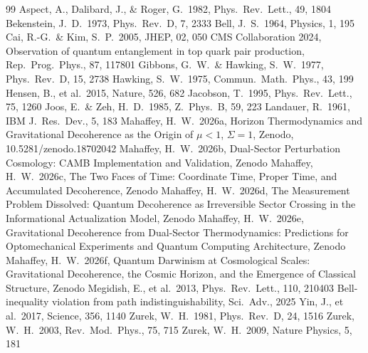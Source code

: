 \documentclass[12pt,a4paper]{article}
\begin{document}
\begin{thebibliography}{99}
 Aspect, A., Dalibard, J., \& Roger, G.\ 1982, Phys.\ Rev.\ Lett., 49, 1804
 Bekenstein, J.\ D.\ 1973, Phys.\ Rev.\ D, 7, 2333
 Bell, J.\ S.\ 1964, Physics, 1, 195
 Cai, R.-G.\ \& Kim, S.\ P.\ 2005, JHEP, 02, 050
 CMS Collaboration 2024, Observation of quantum entanglement in top quark pair production, Rep.\ Prog.\ Phys., 87, 117801
 Gibbons, G.\ W.\ \& Hawking, S.\ W.\ 1977, Phys.\ Rev.\ D, 15, 2738
 Hawking, S.\ W.\ 1975, Commun.\ Math.\ Phys., 43, 199
 Hensen, B., et al.\ 2015, Nature, 526, 682
 Jacobson, T.\ 1995, Phys.\ Rev.\ Lett., 75, 1260
 Joos, E.\ \& Zeh, H.\ D.\ 1985, Z.\ Phys.\ B, 59, 223
 Landauer, R.\ 1961, IBM J.\ Res.\ Dev., 5, 183
 Mahaffey, H.\ W.\ 2026a, Horizon Thermodynamics and Gravitational Decoherence as the Origin of $\mu<1$, $\Sigma=1$, Zenodo, 10.5281/zenodo.18702042
 Mahaffey, H.\ W.\ 2026b, Dual-Sector Perturbation Cosmology: CAMB Implementation and Validation, Zenodo
 Mahaffey, H.\ W.\ 2026c, The Two Faces of Time: Coordinate Time, Proper Time, and Accumulated Decoherence, Zenodo
 Mahaffey, H.\ W.\ 2026d, The Measurement Problem Dissolved: Quantum Decoherence as Irreversible Sector Crossing in the Informational Actualization Model, Zenodo
 Mahaffey, H.\ W.\ 2026e, Gravitational Decoherence from Dual-Sector Thermodynamics: Predictions for Optomechanical Experiments and Quantum Computing Architecture, Zenodo
 Mahaffey, H.\ W.\ 2026f, Quantum Darwinism at Cosmological Scales: Gravitational Decoherence, the Cosmic Horizon, and the Emergence of Classical Structure, Zenodo
 Megidish, E., et al.\ 2013, Phys.\ Rev.\ Lett., 110, 210403
 Bell-inequality violation from path indistinguishability, Sci.\ Adv., 2025
 Yin, J., et al.\ 2017, Science, 356, 1140
 Zurek, W.\ H.\ 1981, Phys.\ Rev.\ D, 24, 1516
 Zurek, W.\ H.\ 2003, Rev.\ Mod.\ Phys., 75, 715
 Zurek, W.\ H.\ 2009, Nature Physics, 5, 181
\end{thebibliography}
\end{document}
